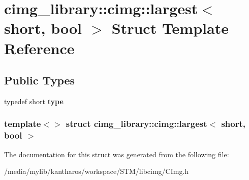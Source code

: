 \hypertarget{structcimg__library_1_1cimg_1_1largest_3_01short_00_01bool_01_4}{
\section{cimg\_\-library::cimg::largest$<$ short, bool $>$ Struct Template Reference}
\label{structcimg__library_1_1cimg_1_1largest_3_01short_00_01bool_01_4}
}
\subsection*{Public Types}
\begin{DoxyCompactItemize}
\item 
\hypertarget{structcimg__library_1_1cimg_1_1largest_3_01short_00_01bool_01_4_a5aed5aa1ec88a0cb988b2c9595a04525}{
typedef short {\bfseries type}}
\label{structcimg__library_1_1cimg_1_1largest_3_01short_00_01bool_01_4_a5aed5aa1ec88a0cb988b2c9595a04525}

\end{DoxyCompactItemize}
\subsubsection*{template$<$$>$ struct cimg\_\-library::cimg::largest$<$ short, bool $>$}



The documentation for this struct was generated from the following file:\begin{DoxyCompactItemize}
\item 
/media/mylib/kantharos/workspace/STM/libcimg/CImg.h\end{DoxyCompactItemize}
